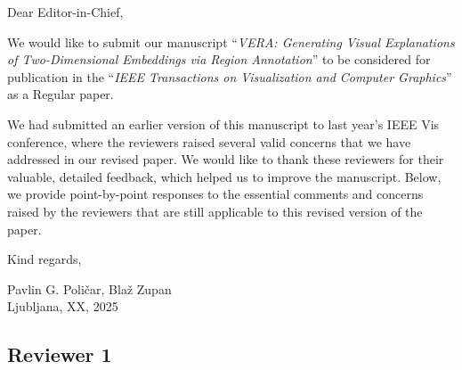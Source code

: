 \documentclass{article}
\newcounter{rtaskno}
\newcommand{\rtask}[1]{\refstepcounter{rtaskno}\label{#1}}
\newcommand{\reviewc}[2]{\begin{leftbar}\noindent\rtask{#1}\ref{#1}. #2\end{leftbar}}
\newlength{\leftbarwidth}
\newlength{\leftbarsep}
\renewenvironment{leftbar}{%
    \def\FrameCommand{{\color{black}{\vrule width \leftbarwidth\relax\hspace {\leftbarsep}}}}%
    \MakeFramed {\advance \hsize -\width \FrameRestore }%
}{\endMakeFramed}
\begin{document}

\vspace{5mm}

\vspace{5mm}


\noindent Dear Editor-in-Chief, \\
 
\vspace{3mm}

\noindent We would like to submit our manuscript ``\textit{VERA: Generating Visual Explanations of Two-Dimensional Embeddings via Region Annotation}'' to be considered for publication in the ``\textit{IEEE Transactions on Visualization and Computer Graphics}'' as a Regular paper.

We had submitted an earlier version of this manuscript to last year's IEEE Vis conference, where the reviewers raised several valid concerns that we have addressed in our revised paper. We would like to thank these reviewers for their valuable, detailed feedback, which helped us to improve the manuscript. Below, we provide point-by-point responses to the essential comments and concerns raised by the reviewers that are still applicable to this revised version of the paper.

\vspace{3mm}

\noindent Kind regards,
\vspace{3mm}

\noindent Pavlin G. Poli\v{c}ar,
Bla\v{z} Zupan \\ 
\noindent Ljubljana, XX, 2025

\vspace{10mm}


\subsection*{Reviewer 1}

\end{document}
